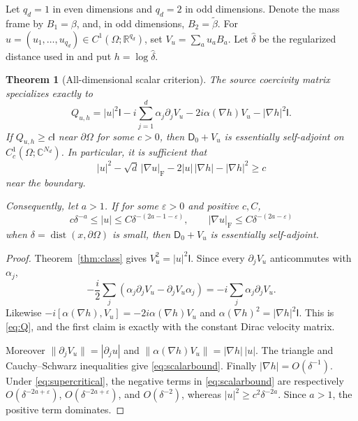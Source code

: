 \documentclass[11pt]{article}
\newtheorem{theorem}{Theorem}
\newcommand{\C}{\mathbb C}
\newcommand{\R}{\mathbb R}
\newcommand{\Id}{\mathsf I}
\newcommand{\Dzero}{\mathsf D_0}
\newcommand{\op}{\operatorname}
\begin{document}
Let $q_d=1$ in even dimensions and $q_d=2$ in odd dimensions.  Denote the
mass frame by $B_1=\beta$, and, in odd dimensions, $B_2=\widetilde\beta$.
For $u=(u_1,\dots,u_{q_d})\in C^1(\Omega;\R^{q_d})$, set
$V_u=\sum_a u_aB_a$.  Let $\widehat\delta$ be the regularized distance used in
\cite[Theorem 2.2]{NNO} and put $h=\log\widehat\delta$.

\begin{theorem}[All-dimensional scalar criterion]\label{thm:coercive}
The source coercivity matrix \cite[Theorem 2.5]{NNO} specializes exactly to
\begin{equation}\label{eq:Q}
 Q_{u,h}=|u|^2\Id-i\sum_{j=1}^d\alpha_j\partial_jV_u
       -2i\alpha(\nabla h)V_u-|\nabla h|^2\Id.
\end{equation}
If $Q_{u,h}\geq c\Id$ near $\partial\Omega$ for some $c>0$, then
$\Dzero+V_u$ is essentially self-adjoint on
$C_c^1(\Omega;\C^{N_d})$.  In particular, it is sufficient that
\begin{equation}\label{eq:scalarbound}
 |u|^2-\sqrt d\,|\nabla u|_{\mathrm F}
 -2|u|\,|\nabla h|-|\nabla h|^2\geq c
\end{equation}
near the boundary.

Consequently, let $a>1$.  If for some $\varepsilon>0$ and positive $c,C$,
\begin{equation}\label{eq:supercritical}
 c\delta^{-a}\leq |u|\leq C\delta^{-(2a-1-\varepsilon)},
 \qquad |\nabla u|_{\mathrm F}\leq C\delta^{-(2a-\varepsilon)}
\end{equation}
when $\delta=\op{dist}(x,\partial\Omega)$ is small, then
$\Dzero+V_u$ is essentially self-adjoint.
\end{theorem}

\begin{proof}
Theorem~\ref{thm:class} gives $V_u^2=|u|^2\Id$.  Since every
$\partial_jV_u$ anticommutes with $\alpha_j$,
\[
 -\frac i2\sum_j(\alpha_j\partial_jV_u-\partial_jV_u\alpha_j)
 =-i\sum_j\alpha_j\partial_jV_u.
\]
Likewise $-i[\alpha(\nabla h),V_u]=-2i\alpha(\nabla h)V_u$ and
$\alpha(\nabla h)^2=|\nabla h|^2\Id$.  This is \eqref{eq:Q}, and the first
claim is exactly \cite[Theorem 2.5]{NNO} with the constant Dirac velocity
matrix.

Moreover $\|\partial_jV_u\|=|\partial_ju|$ and
$\|\alpha(\nabla h)V_u\|=|\nabla h|\,|u|$.  The triangle and Cauchy--Schwarz
inequalities give \eqref{eq:scalarbound}.  Finally
$|\nabla h|=O(\delta^{-1})$.  Under \eqref{eq:supercritical}, the negative
terms in \eqref{eq:scalarbound} are respectively
$O(\delta^{-2a+\varepsilon})$,
$O(\delta^{-2a+\varepsilon})$, and $O(\delta^{-2})$, whereas
$|u|^2\geq c^2\delta^{-2a}$.  Since $a>1$, the positive term dominates.
\end{proof}
\end{document}
